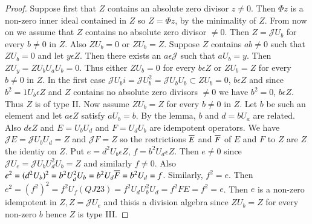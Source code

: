 \begin{proof}
Suppose first that $Z$ contains an absolute zero divisor
$z\neq 0$. Then $\Phi z$ is a non-zero inner ideal contained in
$Z$ so $Z=\Phi z$, by the minimality of
$Z$. From now on we assume that $Z$ contains no
absolute zero divisor $\neq 0$. Then $Z=\mathscr{J}U_b$ for
every $b\neq 0$ in $Z$. Also $Z U_b=0$ or
$Z U_b=Z$. Suppose $Z$ contains
$ab\neq 0$ such that $Z U_b=0$ and let $y\epsilon
Z$. Then there exists an $a\epsilon \mathscr{J}$ such that
$aU_b=y$. Then $Z U_y=Z U_bU_aU_b=0$. Thus either
$ZU_b=0$ for every $b\epsilon Z$ or
$ZU_b=Z$ for every $b\neq 0$ in
$Z$. In the first case $\mathscr{J}
U_bi=\mathscr{J}U^{2}_b=\mathscr{J}U_bU_b\subset Z U_b=0$,
$b\epsilon Z$ and since $b^{2}=1U_b\epsilon Z$
and $Z$ contains no absolute zero divisors $\neq 0$ we have
$b^{2}=0$, $b\epsilon Z$. Thus $Z$ is of type
II. Now assume $Z U_b=Z$ for every $b\neq 0$ in
$Z$. Let $b$ be such an element  and let $a\epsilon
Z$ satisfy $aU_b=b$. By the lemma, $b$ and $d=bU_a$ are
related. Also $d\epsilon Z$ and $E=U_bU_d$ and $F=U_d U_b$
are idempotent operators. We have $\mathscr{J}
E=\mathscr{J}U_bU_d=Z$ and $\mathscr{J} F=Z$ so
the restrictions $\overline{E}$ and $\overline{F}$ of $E$ and $F$ to
$Z$ are $Z$ the identiy on $Z$. Put
$e=d^{2}U_b\epsilon Z$, $f=b^{2}U_d\epsilon
Z$. Then $e\neq 0$ since $\mathscr{J}
U_e=\mathscr{J}U_bU^{2}_dU_b=Z$ and similarly
$f\neq 0$. Also
$e^{2}=(d^{2}U_b)^{2}=b^{2}U^{2}_dU_b=b^{2}U_d\overline{F}=b^{2}U_d=f$. Similarly,
$f^{2}=e$. Then $e^{2}=(f^{2})^{2}=f^{2}U_f(QJ 23)
=f^{2}U_dU^{2}_bU_d=f^{2}FE=f^{2}=e$. Then $e$ is a non-zero
idempotent in $Z,Z=\mathscr{J}U_e$ and
this\pageoriginale is a division algebra since $Z
U_b=Z$ for every non-zero $b$ hence $Z$ is type
III.


\end{proof}
